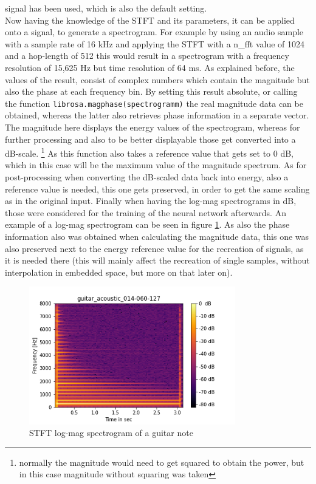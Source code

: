 signal has been used, which is also the default setting.\\

Now having the knowledge of the STFT and its parameters, it can be applied onto a signal, to generate a spectrogram. For example by using an audio sample with a sample rate of 16 kHz and applying the STFT with a n\_fft value of 1024 and a hop-length of 512 this would result in a spectrogram with a frequency resolution of 15,625 Hz but time resolution of 64 ms. As explained before, the values of the result, consist of complex numbers which contain the magnitude but also the phase at each frequency bin. By setting this result absolute, or calling the function \texttt{librosa.magphase(spectrogramm)} the real magnitude data can be obtained, whereas the latter also retrieves phase information in a separate vector. The magnitude here displays the energy values of the spectrogram, whereas for further processing and also to be better displayable those get converted into a dB-scale. \footnote{normally the magnitude would need to get squared to obtain the power, but in this case magnitude without squaring was taken} As this function also takes a reference value that gets set to 0 dB, which in this case will be the maximum value of the magnitude spectrum. As for post-processing when converting the dB-scaled data back into energy, also a reference value is needed, this one gets preserved, in order to get the same scaling as in the original input. Finally when having the log-mag spectrograms in dB, those were considered for the training of the neural network afterwards. An example of a log-mag spectrogram can be seen in figure \ref{fig:spectrogram}. As also the phase information also was obtained when calculating the magnitude data, this one was also preserved next to the energy reference value for the recreation of signals, as it is needed there (this will mainly affect the recreation of single samples, without interpolation in embedded space, but more on that later on).


 \begin{figure}[htb!]
	\caption{STFT log-mag spectrogram of a guitar note}
	\label{fig:spectrogram}
	\centering
	\includegraphics[width=0.8\textwidth]{images/approach/guitar_acoustic_014-060-127.png}
\end{figure}

